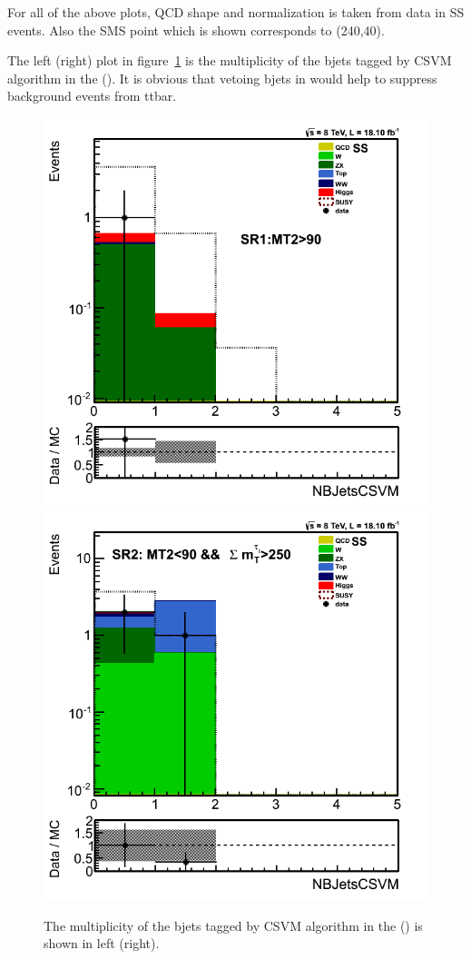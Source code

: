 For all of the above plots, QCD shape and normalization is taken from data in SS events. Also the SMS point which is shown corresponds to (240,40).

The left (right) plot in figure~\ref{fig:nbjets} is the multiplicity of the bjets tagged by CSVM algorithm in the \binone (\bintwo). It is obvious that vetoing bjets in \bintwo would help to suppress background events from ttbar. 

\begin{figure}[!Hhtb]
\centering
\includegraphics[angle=0,scale=0.35]{TauTauFigs/SR1NBJetsCSVM.png}
\includegraphics[angle=0,scale=0.35]{TauTauFigs/SR2NBJetsCSVM.png} \\
\caption{The multiplicity of the bjets tagged by CSVM algorithm in the \binone (\bintwo) is shown in left (right).}
\label{fig:nbjets}
\end{figure}


